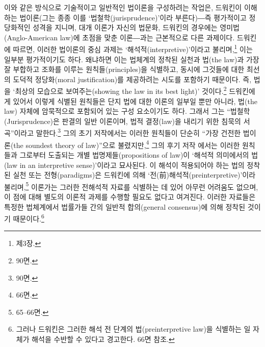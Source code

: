 이와 같은 방식으로 기술적이고 일반적인 법이론을 구성하려는 작업은,
드워킨이 이해하는 법이론(그는 종종 이를 `법철학(jurisprudence)'이라
부른다)―즉 평가적이고 정당화적인 성격을 지니며, 대개 이론가 자신의
법문화, 드워킨의 경우에는 영미법(Anglo-American law)에 초점을 맞춘
이론―과는 근본적으로 다른 과제이다. 드워킨에 따르면, 이러한 법이론의
중심 과제는 `해석적(interpretive)'이라고 불리며,\footnote{
  제3장.} 이는 일부분 평가적이기도 하다. 왜냐하면 이는 법체계의 정착된
실천과 법(the law)과 가장 잘 부합하고 조화를 이루는 원칙들(principles)을
식별하고, 동시에 그것들에 대한 최선의 도덕적 정당화(moral
justification)를 제공하려는 시도를 포함하기 때문이다. 즉, 법을 `최상의
모습으로 보여주는(showing the law in its best light)' 것이다.\footnote{
  90면.} 드워킨에게 있어서 이렇게 식별된 원칙들은 단지 법에 대한 이론의
일부일 뿐만 아니라, 법(the law) 자체에 암묵적으로 포함되어 있는 구성
요소이기도 하다. 그래서 그는 ``법철학(Jurisprudence)은 판결의 일반
이론이며, 법적 결정(law)을 내리기 위한 침묵의 서곡''이라고
말한다.\footnote{ 90면.} 그의 초기 저작에서는 이러한 원칙들이
단순히 ``가장 건전한 법이론(the soundest theory of law)''으로
불렸지만,\footnote{ 66면.} 그의 후기 저작 에서는 이러한 원칙들과 그로부터 도출되는 개별
법명제들(propositions of law)이 `해석적 의미에서의 법(law in an
interpretive sense)'이라고 묘사된다. 이 해석이 적용되어야 하는 법의
정착된 실천 또는 전형(paradigms)은 드워킨에 의해
`전(前)해석적(preinterpretive)'이라 불리며,\footnote{ 65--66면.}
이론가는 그러한 전해석적 자료를 식별하는 데 있어 아무런 어려움도 없으며,
이 점에 대해 별도의 이론적 과제를 수행할 필요도 없다고 여겨진다. 이러한
자료들은 특정한 법체계에서 법률가들 간의 일반적 합의(general
consensus)에 의해 정착된 것이기 때문이다.\footnote{그러나 드워킨은
  그러한 해석 전 단계의 법(preinterpretive law)을 식별하는 일 자체가
  해석을 수반할 수 있다고 경고한다.  66면 참조.}

